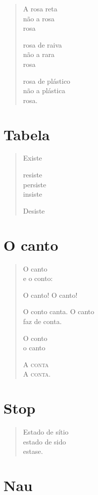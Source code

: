\begin{verse}
A rosa reta\\
não a rosa\\
\quad rosa

rosa de raiva\\
não a rara\\
\quad rosa

rosa de plástico\\
não a plástica\\
\quad rosa.
\end{verse}

\chapter{Tabela}

\begin{verse}
Existe

resiste\\
persiste\\
insiste

\quad\quad Desiste
\end{verse}

\chapter{O canto}

\begin{verse}
O canto\\
e o conto:

O canto! O canto!

O conto canta. O canto\\
\hfill faz de conta.

O conto\\
o canto

A \textsc{conta}\\
A \textsc{conta}.
\end{verse}

\chapter{Stop}

\begin{verse}
Estado de sítio\\
estado de sido\\
estase.
\end{verse}

\chapter{Nau}

